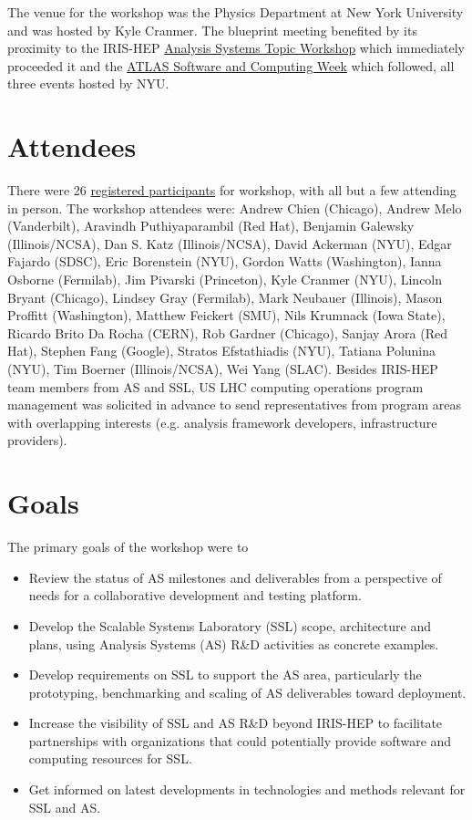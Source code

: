 \documentclass[11pt,letterpaper,fleqn]{article}
\begin{document}
The venue for the workshop was the Physics Department at New York University and was hosted by Kyle Cranmer.  The blueprint meeting benefited by its proximity to the IRIS-HEP \href{https://indico.cern.ch/event/822074/}{Analysis Systems Topic Workshop} which immediately proceeded it and the \href{https://indico.cern.ch/event/765245/}{ATLAS Software and Computing Week} which followed, all three events hosted by NYU.

\section{Attendees}
There were 26 \href{https://indico.cern.ch/event/820946/registrations/participants}{registered participants} for workshop, with all but a few attending in person. The workshop attendees were:
Andrew Chien (Chicago),
Andrew Melo (Vanderbilt),
Aravindh Puthiyaparambil (Red Hat),
Benjamin Galewsky (Illinois/NCSA),
Dan S. Katz (Illinois/NCSA),
David Ackerman (NYU),
Edgar Fajardo (SDSC),
Eric Borenstein (NYU),
Gordon Watts (Washington),
Ianna Osborne (Fermilab),
Jim Pivarski (Princeton),
Kyle Cranmer (NYU),
Lincoln Bryant (Chicago),
Lindsey Gray (Fermilab),
Mark Neubauer (Illinois),
Mason Proffitt (Washington),
Matthew Feickert (SMU),
Nils Krumnack (Iowa State),
Ricardo Brito Da Rocha (CERN),
Rob Gardner (Chicago),
Sanjay Arora (Red Hat),
Stephen Fang (Google),
Stratos Efstathiadis (NYU),
Tatiana Polunina (NYU),
Tim Boerner (Illinois/NCSA),
Wei Yang (SLAC).  Besides IRIS-HEP team members from AS and SSL, US LHC computing operations program management was solicited in advance to send representatives from program areas with overlapping interests (e.g. analysis framework developers, infrastructure providers).


\section{Goals}
The primary goals of the workshop were to

\begin{itemize}
  \item Review the status of AS milestones and deliverables from a perspective of needs for a collaborative development and testing platform.
  \item Develop the Scalable Systems Laboratory (SSL) scope, architecture and plans, using Analysis Systems (AS) R\&D activities as concrete examples.
  \item Develop requirements on SSL to support the AS area, particularly the prototyping, benchmarking and scaling of AS deliverables toward deployment.
  \item Increase the visibility of SSL and AS R\&D beyond IRIS-HEP to facilitate partnerships with organizations that could potentially provide software and computing resources for SSL.
  \item Get informed on latest developments in technologies and methods relevant for SSL and AS.
\end{itemize}
\end{document}
